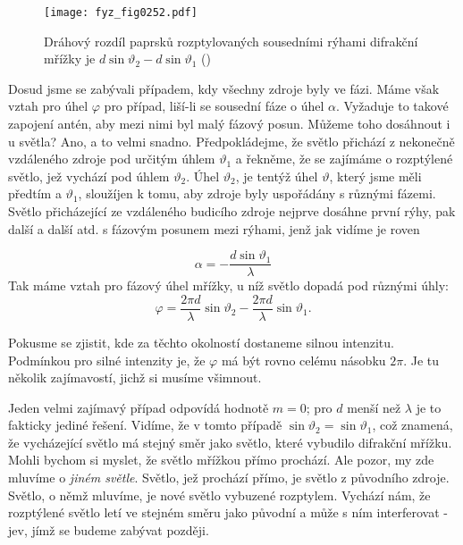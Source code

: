     \begin{figure}[ht!] %
      \centering
      \texttt{[image: fyz\_fig0252.pdf]}
      \caption{Dráhový rozdíl paprsků rozptylovaných sousedními rýhami difrakční mřížky je 
               \(d\sin\vartheta_2 - d\sin\vartheta_1\)
               (\cite[s.~396]{Feynman01})}
      \label{fyz:fig0252}
    \end{figure}
    
    Dosud jsme se zabývali případem, kdy všechny zdroje byly ve fázi. Máme však vztah pro úhel 
    \(\varphi\) pro případ, liší-li se sousední fáze o úhel \(\alpha\). Vyžaduje to takové zapojení 
    antén, aby mezi nimi byl malý fázový posun. Můžeme toho dosáhnout i u světla? Ano, a to velmi 
    snadno. Předpokládejme, že světlo přichází z nekonečně vzdáleného zdroje pod určitým úhlem 
    \(\vartheta_1\) a řekněme, že se zajímáme o rozptýlené světlo, jež vychází pod úhlem 
    \(\vartheta_2\). Úhel \(\vartheta_2\), je tentýž úhel \(\vartheta\), který jsme měli předtím 
    a \(\vartheta_1\), sloužíjen k tomu, aby zdroje byly uspořádány s různými fázemi. Světlo 
    přicházející ze vzdáleného budicího zdroje nejprve dosáhne první rýhy, pak další a další atd. s 
    fázovým posunem mezi rýhami, jenž jak vidíme je roven
    
    \begin{equation*}
      \alpha = - \frac{d\sin\vartheta_1}{\lambda}
    \end{equation*}
    Tak máme vztah pro fázový úhel mřížky, u níž světlo dopadá pod různými úhly:
    \begin{equation}\label{fyz:eq324}
      \varphi = \frac{2\pi d}{\lambda}\sin\vartheta_2 - 
                \frac{2\pi d}{\lambda}\sin\vartheta_1.               
    \end{equation}
    
    Pokusme se zjistit, kde za těchto okolností dostaneme silnou intenzitu. Podmínkou pro silné 
    intenzity je, že \(\varphi\) má být rovno celému násobku \(2\pi\). Je tu několik zajímavostí, 
    jichž si musíme všimnout.
    
    Jeden velmi zajímavý případ odpovídá hodnotě \(m = 0\); pro \(d\) menší než \(\lambda\) je to 
    fakticky jediné řešení. Vidíme, že v tomto případě \(\sin\vartheta_2 = \sin\vartheta_1\), což 
    znamená, že vycházející světlo má stejný směr jako světlo, které vybudilo difrakční mřížku. 
    Mohli bychom si myslet, že světlo mřížkou přímo prochází. Ale pozor, my zde mluvíme o 
    \emph{jiném světle}. Světlo, jež prochází přímo, je světlo z původního zdroje. Světlo, o němž 
    mluvíme, je nové světlo vybuzené rozptylem. Vychází nám, že rozptýlené světlo letí ve stejném 
    směru jako původní a může s ním interferovat - jev, jímž se budeme zabývat později.
    
